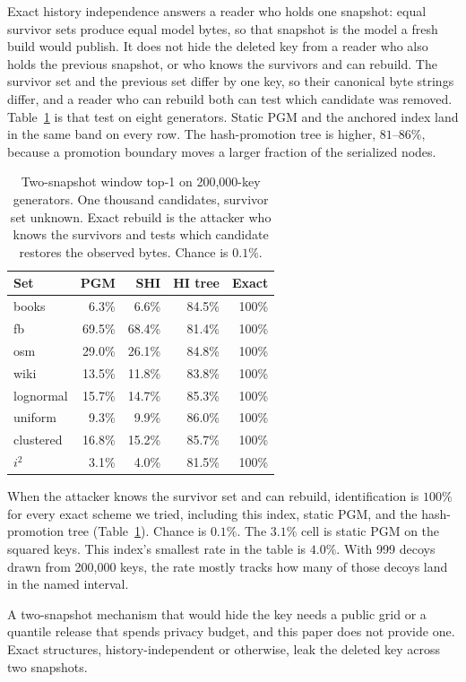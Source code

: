 \documentclass[conference]{IEEEtran}
\begin{document}
Exact history independence answers a reader who holds one snapshot: equal survivor sets produce equal model bytes, so that snapshot is the model a fresh build would publish.
It does not hide the deleted key from a reader who also holds the previous snapshot, or who knows the survivors and can rebuild.
The survivor set and the previous set differ by one key, so their canonical byte strings differ, and a reader who can rebuild both can test which candidate was removed.
Table~\ref{tab:t2} is that test on eight generators.
Static PGM and the anchored index land in the same band on every row.
The hash-promotion tree is higher, $81$--$86\%$, because a promotion boundary moves a larger fraction of the serialized nodes.
\begin{table}[t]
\caption{Two-snapshot window top-1 on 200{,}000-key generators.
One thousand candidates, survivor set unknown.
Exact rebuild is the attacker who knows the survivors and tests which candidate restores the observed bytes.
Chance is $0.1\%$.}
\label{tab:t2}
\centering
\footnotesize
\begin{tabular}{@{}lrrrr@{}}
\toprule
Set & PGM & SHI & HI tree & Exact \\
\midrule
books     & 6.3\% & 6.6\% & 84.5\% & 100\% \\
fb        & 69.5\% & 68.4\% & 81.4\% & 100\% \\
osm       & 29.0\% & 26.1\% & 84.8\% & 100\% \\
wiki      & 13.5\% & 11.8\% & 83.8\% & 100\% \\
\addlinespace
lognormal & 15.7\% & 14.7\% & 85.3\% & 100\% \\
uniform   & 9.3\% & 9.9\% & 86.0\% & 100\% \\
clustered & 16.8\% & 15.2\% & 85.7\% & 100\% \\
\addlinespace
$i^{2}$   & 3.1\% & 4.0\% & 81.5\% & 100\% \\
\bottomrule
\end{tabular}
\end{table}

When the attacker knows the survivor set and can rebuild, identification is $100\%$ for every exact scheme we tried, including this index, static PGM, and the hash-promotion tree (Table~\ref{tab:t2}).
Chance is $0.1\%$.
The $3.1\%$ cell is static PGM on the squared keys.
This index's smallest rate in the table is $4.0\%$.
With 999 decoys drawn from 200{,}000 keys, the rate mostly tracks how many of those decoys land in the named interval.

A two-snapshot mechanism that would hide the key needs a public grid or a quantile release that spends privacy budget, and this paper does not provide one.
Exact structures, history-independent or otherwise, leak the deleted key across two snapshots.
\end{document}
